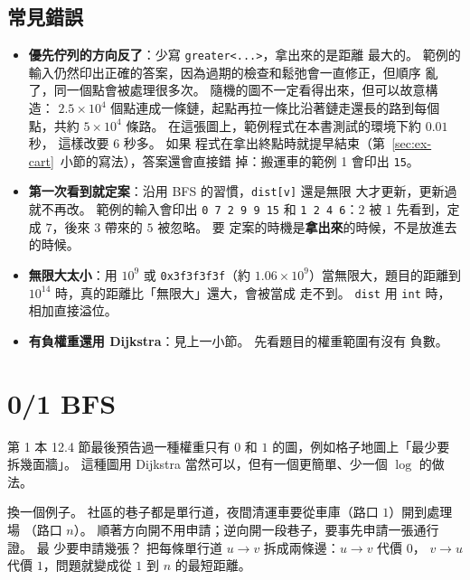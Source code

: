 \subsection{常見錯誤}

\begin{itemize}
\item \textbf{優先佇列的方向反了}：少寫 \texttt{greater<...>}，拿出來的是距離
最大的。 範例的輸入仍然印出正確的答案，因為過期的檢查和鬆弛會一直修正，但順序
亂了，同一個點會被處理很多次。 隨機的圖不一定看得出來，但可以故意構造：
$2.5 \times 10^4$ 個點連成一條鏈，起點再拉一條比沿著鏈走還長的路到每個點，共約
$5 \times 10^4$ 條路。 在這張圖上，範例程式在本書測試的環境下約 $0.01$ 秒，
這樣改要 $6$ 秒多。 如果
程式在拿出終點時就提早結束（第~\ref{sec:ex-cart}~小節的寫法），答案還會直接錯
掉：搬運車的範例 1 會印出 \texttt{15}。
\item \textbf{第一次看到就定案}：沿用 BFS 的習慣，\texttt{dist[v]} 還是無限
大才更新，更新過就不再改。 範例的輸入會印出 \texttt{0 7 2 9 9 15} 和
\texttt{1 2 4 6}：$2$ 被 $1$ 先看到，定成 $7$，後來 $3$ 帶來的 $5$ 被忽略。 要
定案的時機是\textbf{拿出來}的時候，不是放進去的時候。
\item \textbf{無限大太小}：用 $10^9$ 或 \texttt{0x3f3f3f3f}（約 $1.06 \times
10^9$）當無限大，題目的距離到 $10^{14}$ 時，真的距離比「無限大」還大，會被當成
走不到。 \texttt{dist} 用 \texttt{int} 時，相加直接溢位。
\item \textbf{有負權重還用 Dijkstra}：見上一小節。 先看題目的權重範圍有沒有
負數。
\end{itemize}

\section{0/1 BFS}
\label{sec:sp-01bfs}

第 1 本 12.4 節最後預告過一種權重只有 $0$ 和 $1$ 的圖，例如格子地圖上「最少要
拆幾面牆」。 這種圖用 Dijkstra 當然可以，但有一個更簡單、少一個 $\log$ 的做
法。

換一個例子。 社區的巷子都是單行道，夜間清運車要從車庫（路口 $1$）開到處理場
（路口 $n$）。 順著方向開不用申請；逆向開一段巷子，要事先申請一張通行證。 最
少要申請幾張？ 把每條單行道 $u \to v$ 拆成兩條邊：$u \to v$ 代價 $0$，
$v \to u$ 代價 $1$，問題就變成從 $1$ 到 $n$ 的最短距離。

\begin{center}
\label{fig:sp-oneway}
\end{center}

